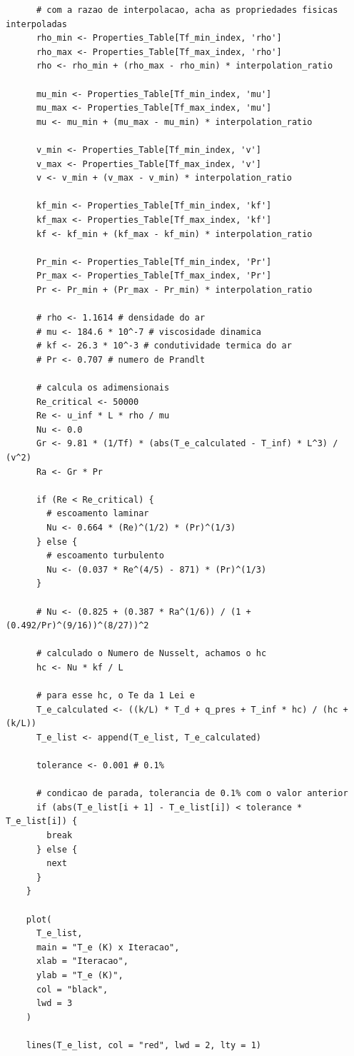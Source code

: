 \documentclass[12pt]{scrartcl}
\begin{document}
\begin{lstlisting}
      # com a razao de interpolacao, acha as propriedades fisicas interpoladas
      rho_min <- Properties_Table[Tf_min_index, 'rho']
      rho_max <- Properties_Table[Tf_max_index, 'rho']
      rho <- rho_min + (rho_max - rho_min) * interpolation_ratio
      
      mu_min <- Properties_Table[Tf_min_index, 'mu']
      mu_max <- Properties_Table[Tf_max_index, 'mu']
      mu <- mu_min + (mu_max - mu_min) * interpolation_ratio
      
      v_min <- Properties_Table[Tf_min_index, 'v']
      v_max <- Properties_Table[Tf_max_index, 'v']
      v <- v_min + (v_max - v_min) * interpolation_ratio
      
      kf_min <- Properties_Table[Tf_min_index, 'kf']
      kf_max <- Properties_Table[Tf_max_index, 'kf']
      kf <- kf_min + (kf_max - kf_min) * interpolation_ratio
      
      Pr_min <- Properties_Table[Tf_min_index, 'Pr']
      Pr_max <- Properties_Table[Tf_max_index, 'Pr']
      Pr <- Pr_min + (Pr_max - Pr_min) * interpolation_ratio
      
      # rho <- 1.1614 # densidade do ar
      # mu <- 184.6 * 10^-7 # viscosidade dinamica
      # kf <- 26.3 * 10^-3 # condutividade termica do ar
      # Pr <- 0.707 # numero de Prandlt
      
      # calcula os adimensionais
      Re_critical <- 50000
      Re <- u_inf * L * rho / mu
      Nu <- 0.0
      Gr <- 9.81 * (1/Tf) * (abs(T_e_calculated - T_inf) * L^3) / (v^2)
      Ra <- Gr * Pr
      
      if (Re < Re_critical) {
        # escoamento laminar
        Nu <- 0.664 * (Re)^(1/2) * (Pr)^(1/3)
      } else {
        # escoamento turbulento
        Nu <- (0.037 * Re^(4/5) - 871) * (Pr)^(1/3)
      }
      
      # Nu <- (0.825 + (0.387 * Ra^(1/6)) / (1 + (0.492/Pr)^(9/16))^(8/27))^2
      
      # calculado o Numero de Nusselt, achamos o hc
      hc <- Nu * kf / L
      
      # para esse hc, o Te da 1 Lei e
      T_e_calculated <- ((k/L) * T_d + q_pres + T_inf * hc) / (hc + (k/L))
      T_e_list <- append(T_e_list, T_e_calculated)
      
      tolerance <- 0.001 # 0.1% 
      
      # condicao de parada, tolerancia de 0.1% com o valor anterior
      if (abs(T_e_list[i + 1] - T_e_list[i]) < tolerance * T_e_list[i]) {
        break
      } else {
        next
      }
    }
    
    plot(
      T_e_list,
      main = "T_e (K) x Iteracao",
      xlab = "Iteracao",
      ylab = "T_e (K)",
      col = "black",
      lwd = 3
    )
    
    lines(T_e_list, col = "red", lwd = 2, lty = 1)
\end{lstlisting}
\end{document}
